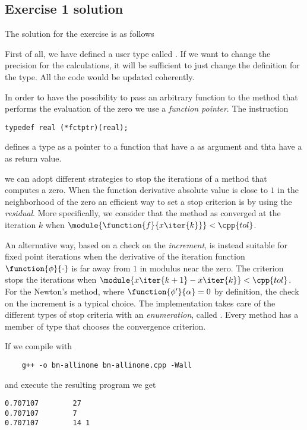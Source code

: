 \subsection*{Exercise 1 solution}

The solution for the exercise is as follows
%
\lstset{basicstyle=\scriptsize\sf}
    
\lstset{basicstyle=\sf}

First of all, we have defined a user type called . If we want to
change the precision for the calculations, it will be sufficient to just change
the definition for the  type. All the code would be updated
coherently.

In order to have the possibility to pass an arbitrary function to the method
that performs the evaluation of the zero we use a \emph{function pointer}. The
instruction
\begin{lstlisting}
typedef real (*fctptr)(real);
\end{lstlisting}
defines a type  as a pointer to a function that have a  as
argument and thta have a  as return value.

we can adopt different strategies to stop the iterations of a method that
computes a zero. When the function derivative absolute value is close to $1$ in
the neighborhood of the zero an efficient way to set a stop criterion is by
using the \emph{residual}. More specifically, we consider that the method as
converged at the iteration $k$ when $\module{\function{f}{x\iter{k}}} <
\cpp{tol}$.

An alternative way, based on a check on the \emph{increment}, is instead
suitable for fixed point iterations when the derivative of the iteration
function $\function{\phi}{\cdot}$ is far away from $1$ in modulus near the zero.
The criterion stops the iterations when $\module{x\iter{k+1} - x\iter{k}} <
\cpp{tol}$. For the Newton's method, where $\function{\phi'}{\alpha} = 0$ by
definition, the check on the increment is a typical choice. The implementation
takes care of the different types of stop criteria with an \emph{enumeration},
called . Every method has a member  of type
 that chooses the convergence criterion.

If we compile with
\begin{verbatim}
    g++ -o bn-allinone bn-allinone.cpp -Wall
\end{verbatim}
and execute the resulting program we get
\begin{verbatim}
0.707107        27
0.707107        7
0.707107        14 1
\end{verbatim}

